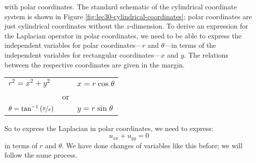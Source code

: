  with polar coordinates.  The standard schematic of the cylindrical coordinate system is shown in Figure \ref{fig:lec30-cylindrical-coordinates}; polar coordinates are just cylindrical coordinates without the $z$-dimension.  To derive an expression for the Laplacian operator in polar coordinates, we need to be able to express the independent variables for polar coordinates---$r$ and $\theta$---in terms of the independent variables for rectangular coordinates---$x$ and $y$.  The relations between the respective coordinates are given in the margin.
\begin{margintable}
\begin{tabular}{l l l}
$r^2 = x^2 + y^2$ & & $x = r \cos{\theta} $ \\
 & \multicolumn{1}{c}{or} & \\
 $\theta = \tan^{-1}{(\sfrac{y}{x})}$ & & $y = r \sin{\theta}$\\
 \end{tabular}
\end{margintable}
So to express the Laplacian in polar coordinates, we need to express:
\begin{equation*}
u_{xx} + u_{yy} = 0
\end{equation*}
in terms of $r$ and $\theta$.  We have done changes of variables like this before; we will follow the same process.

